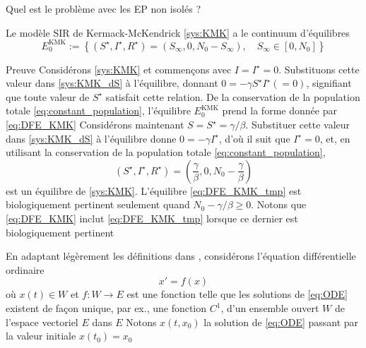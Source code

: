 \documentclass[aspectratio=169]{beamer}\usepackage[]{graphicx}\usepackage[]{xcolor}
\begin{document}
\begin{frame}{Quel est le problème avec les EP non isolés ?}
\begin{proposition}\label{prop:EP_KMK}
Le modèle SIR de Kermack-McKendrick \eqref{sys:KMK} a le continuum d'équilibres
\begin{equation}
\label{eq:DFE_KMK}
    E_0^\text{KMK}:=\left\{
    (S^\star,I^\star,R^\star)=(S_\infty,0,N_0-S_\infty),\quad S_\infty\in[0,N_0]
    \right\}
\end{equation}
\end{proposition}
\end{frame}

\begin{frame}{Preuve}
Considérons \eqref{sys:KMK} et commençons avec $I=I^\star=0$.
Substituons cette valeur dans \eqref{sys:KMK_dS} à l'équilibre, donnant $0 = -\gamma S^\star I^\star(=0)$, signifiant que toute valeur de $S^\star$ satisfait cette relation. De la conservation de la population totale \eqref{eq:constant_population}, l'équilibre $E_0^\text{KMK}$ prend la forme donnée par \eqref{eq:DFE_KMK}
\vfill
Considérons maintenant $S=S^\star=\gamma/\beta$. Substituer cette valeur dans \eqref{sys:KMK_dS} à l'équilibre donne $0 = -\gamma I^\star$, d'où il suit que $I^\star=0$, et, en utilisant la conservation de la population totale \eqref{eq:constant_population},
\begin{equation}\label{eq:DFE_KMK_tmp}
    (S^\star,I^\star,R^\star)=\left(
    \frac{\gamma}{\beta},0,N_0-\frac{\gamma}{\beta}
    \right)
\end{equation}
est un équilibre de \eqref{sys:KMK}. 
L'équilibre \eqref{eq:DFE_KMK_tmp} est biologiquement pertinent seulement quand $N_0-\gamma/\beta\geq 0$.
Notons que \eqref{eq:DFE_KMK} inclut \eqref{eq:DFE_KMK_tmp} lorsque ce dernier est biologiquement pertinent
\end{frame}

\begin{frame}
En adaptant légèrement les définitions dans \cite{HirschSmale1974}, considérons l'équation différentielle ordinaire
\begin{equation}\label{eq:ODE}
    x' = f(x)
\end{equation}
où $x(t)\in W$ et $f:W\to E$ est une fonction telle que les solutions de \eqref{eq:ODE} existent de façon unique, par ex., une fonction $C^1$, d'un ensemble ouvert $W$ de l'espace vectoriel $E$ dans $E$
\vfill
Notons $x(t,x_0)$ la solution de \eqref{eq:ODE} passant par la valeur initiale $x(t_0)=x_0$
\end{frame}
\end{document}
